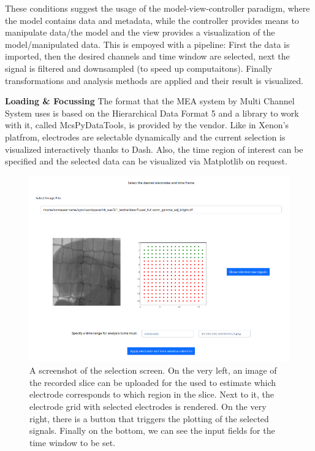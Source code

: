 \documentclass[11pt, twocolumn]{article}
\begin{document}
		These conditions suggest the usage of the model-view-controller paradigm, where the model contains data and metadata, while the controller provides means to manipulate data/the model and the view provides a visualization of the model/manipulated data.
		This is empoyed with a pipeline: First the data is imported, then the desired channels and time window are selected, next the signal is filtered and downsampled (to speed up computaitons).
		Finally transformations and analysis methods are applied and their result is visualized.

		\textbf{Loading \& Focussing}
            The format that the MEA system by Multi Channel System uses is based on the Hierarchical Data Format 5 and a library to work with it, called McsPyDataTools, is provided by the vendor.
			Like in Xenon's platfrom, electrodes are selectable dynamically and the current selection is visualized interactively thanks to Dash. Also, the time region of interest can be specified and the selected data can be visualized via Matplotlib on request.
			\begin{figure}
			 \begin{center}
			  \includegraphics[keepaspectratio, width=\linewidth]{img/4_select.png}
			 \end{center}
				\caption{A screenshot of the selection screen. On the very left, an image of the recorded slice can be uploaded for the used to estimate which electrode corresponds to which region in the slice. Next to it, the electrode grid with selected electrodes is rendered. On the very right, there is a button that triggers the plotting of the selected signals. Finally on the bottom, we can see the input fields for the time window to be set.}
			\end{figure}
\end{document}
